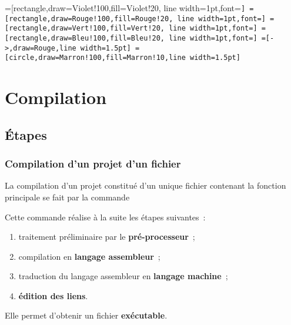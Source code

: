 
=[rectangle,draw=Violet!100,fill=Violet!20,
    line width=1pt,font=\scriptsize\tt]
=[rectangle,draw=Rouge!100,fill=Rouge!20,
    line width=1pt,font=\scriptsize\tt]
=[rectangle,draw=Vert!100,fill=Vert!20,
    line width=1pt,font=\scriptsize\tt]
=[rectangle,draw=Bleu!100,fill=Bleu!20,
    line width=1pt,font=\scriptsize\tt]
=[->,draw=Rouge,line width=1.5pt]
=[circle,draw=Marron!100,fill=Marron!10,line width=1.5pt]

\section{Compilation}

\subsection{Étapes}

\begin{frame}[fragile]
\frametitle{Compilation d'un projet d'un fichier}
La \alert{compilation} d'un projet constitué d'un \alert{unique fichier}
 contenant la fonction principale  se fait
par la commande
\begin{center}\end{center}
\medskip

Cette commande réalise à la suite les étapes suivantes~:
\begin{enumerate}
    \item traitement préliminaire par le {\bf pré-processeur}~;
    \smallskip

    \item compilation en {\bf langage assembleur}~;
    \smallskip

    \item traduction du langage assembleur en {\bf langage machine}~;
    \smallskip

    \item {\bf édition des liens}.
\end{enumerate}
\medskip

Elle permet d'obtenir un fichier {\bf exécutable}.
\end{frame}

